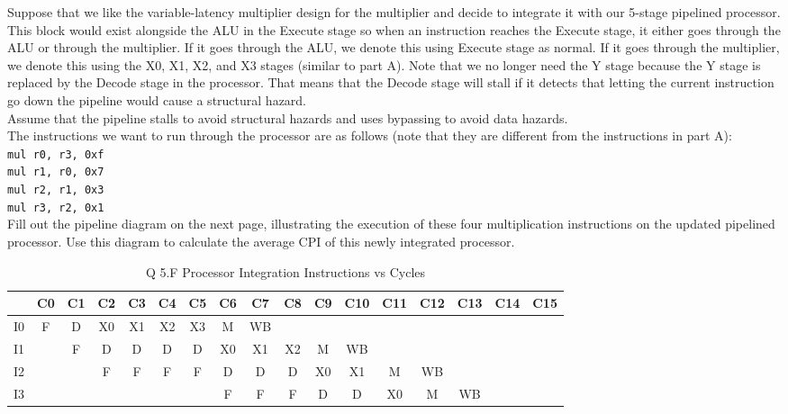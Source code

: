 \documentclass[a4paper,11pt]{article}
\begin{document}
Suppose that we like the variable-latency multiplier design for the multiplier and decide to integrate it with our 5-stage pipelined processor. This block would exist alongside the ALU in the Execute stage so when an instruction reaches the Execute stage, it either goes through the ALU or through the multiplier. If it goes through the ALU, we denote this using Execute stage as normal. If it goes through the multiplier, we denote this using the X0, X1, X2, and X3 stages (similar to part A). Note that we no longer need the Y stage because the Y stage is replaced by the Decode stage in the processor. That means that the Decode stage will stall if it detects that letting the current instruction go down the pipeline would cause a structural hazard. \\

Assume that the pipeline stalls to avoid structural hazards and uses bypassing to avoid data hazards. \\

The instructions we want to run through the processor are as follows (note that they are different from the instructions in part A): \\
\texttt{mul r0, r3, 0xf} \\
\texttt{mul r1, r0, 0x7} \\
\texttt{mul r2, r1, 0x3} \\
\texttt{mul r3, r2, 0x1} \\

Fill out the pipeline diagram on the next page, illustrating the execution of these four multiplication instructions on the updated pipelined processor. Use this diagram to calculate the average CPI of this newly integrated processor.



\begin{table}[H]
\caption{Q 5.F Processor Integration Instructions vs Cycles}
\begin{center}
\begin{tabular}{|c|c|c|c|c|c|c|c|c|c|c|c|c|c|c|c|c|} \hline
     & C0 & C1 & C2 & C3 & C4  & C5  & C6   & C7   & C8 & C9 & C10 & C11 & C12 & C13 & C14 & C15  \\ \hline
  I0 & F  &  D & X0 & X1 & X2  & X3  & M    & WB   &    &     &     &     &     &     &    &      \\ \hline   
  I1 &    &  F & D  & D  & D   & D   & X0   & X1   & X2 & M   & WB  &     &     &     &    &      \\ \hline   
  I2 &    &    & F  & F  & F   & F   & D    & D    & D  & X0  & X1  & M   &  WB &     &    &      \\ \hline   
  I3 &    &    &    &    &     &     & F    & F    & F  & D   & D   & X0  &  M  & WB  &    &      \\ \hline   
\end{tabular}
\end{center}
\end{table}
\end{document}
